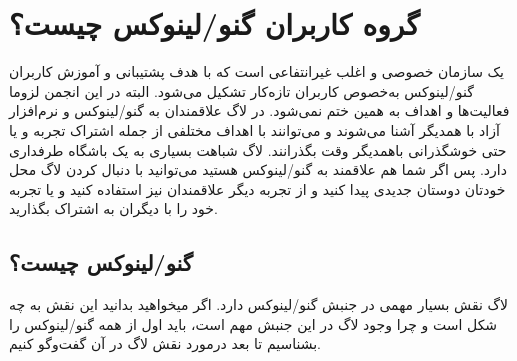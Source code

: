 \section{گروه کاربران گنو/لینوکس چیست؟}
یک سازمان خصوصی و اغلب غیرانتفاعی است که با هدف پشتیبانی و آموزش کاربران گنو/لینوکس
به‌خصوص کاربران تازه‌کار تشکیل می‌شود. البته در این انجمن لزوما فعالیت‌ها و اهداف به همین ختم نمی‌شود.
در لاگ علاقمندان به گنو/لینوکس و نرم‌افزار آزاد با همدیگر آشنا می‌شوند و می‌توانند با اهداف مختلفی از جمله
اشتراک تجربه و یا حتی خوشگذرانی باهمدیگر وقت بگذرانند. لاگ شباهت بسیاری به یک باشگاه طرفداری دارد.
پس اگر شما هم علاقمند به گنو/لینوکس هستید می‌توانید با دنبال کردن لاگ محل خودتان دوستان جدیدی
پیدا کنید و از تجربه دیگر علاقمندان نیز استفاده کنید و یا تجربه خود را با دیگران به اشتراک بگذارید.

\subsection{گنو/لینوکس چیست؟}
لاگ نقش بسیار مهمی در جنبش گنو/لینوکس دارد. اگر میخواهید بدانید این نقش به چه شکل است
و چرا وجود لاگ در این جنبش مهم است، باید اول از همه گنو/لینوکس را بشناسیم تا بعد درمورد
نقش لاگ در آن گفت‌وگو کنیم.

